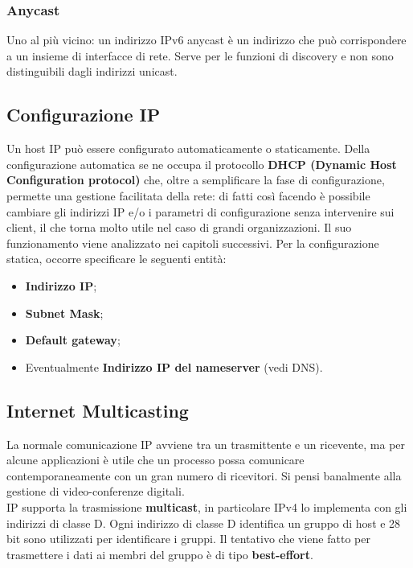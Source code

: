             \subsubsection*{Anycast}
            Uno al più vicino: un indirizzo IPv6 anycast è un indirizzo che può corrispondere a un insieme
            di interfacce di rete. Serve per le funzioni di discovery e non sono distinguibili dagli indirizzi
            unicast.
            
        \subsection{Configurazione IP}
        Un host IP può essere configurato automaticamente o staticamente. Della configurazione
        automatica se ne occupa il protocollo \textbf{DHCP (Dynamic Host Configuration protocol)} che,
        oltre a semplificare la fase di configurazione, permette una gestione facilitata della rete: di fatti
        così facendo è possibile cambiare gli indirizzi IP e/o i parametri di configurazione senza
        intervenire sui client, il che torna molto utile nel caso di grandi organizzazioni. Il suo
        funzionamento viene analizzato nei capitoli successivi.
        Per la configurazione statica, occorre specificare le seguenti entità:
        \begin{itemize}
            \item \textbf{Indirizzo IP};
            \item \textbf{Subnet Mask};
            \item \textbf{Default gateway};
            \item Eventualmente \textbf{Indirizzo IP del nameserver} (vedi DNS).
        \end{itemize}       

        \subsection{Internet Multicasting}
        La normale comunicazione IP avviene tra un trasmittente e un ricevente, ma per alcune
        applicazioni è utile che un processo possa comunicare contemporaneamente con un gran
        numero di ricevitori. Si pensi banalmente alla gestione di video-conferenze digitali.\\
        
        IP supporta la trasmissione \textbf{multicast}, in particolare IPv4 lo implementa con gli indirizzi di
        classe D. Ogni indirizzo di classe D identifica un gruppo di host e 28 bit sono utilizzati per
        identificare i gruppi. Il tentativo che viene fatto per trasmettere i dati ai membri del gruppo è
        di tipo \textbf{best-effort}.\\
        
